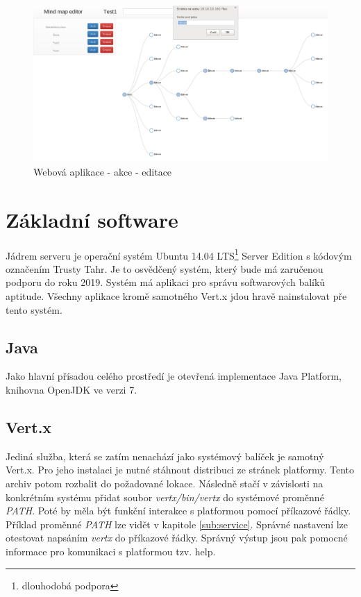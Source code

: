\begin{figure}
\begin{centering}
\includegraphics[width	=1\textwidth]{obrazky/mindmap3}
\par\end{centering}
\caption{Webová aplikace - akce - editace\label{fig:midnmap3}}
\end{figure}

\section{Základní software}

Jádrem serveru je operační systém Ubuntu\cite{ubuntu} 14.04 LTS\footnote{dlouhodobá podpora} Server Edition s kódovým označením 
Trusty Tahr. Je to osvědčený systém, který bude má zaručenou podporu do roku 2019. Systém má aplikaci pro správu softwarových balíků 
aptitude. Všechny aplikace kromě samotného Vert.x jdou hravě nainstalovat pře tento systém.

\subsection{Java}

Jako hlavní přísadou celého prostředí je otevřená implementace Java Platform, knihovna OpenJDK ve verzi 7.

\subsection{Vert.x}

Jediná služba, která se zatím nenachází jako systémový balíček je samotný Vert.x. Pro jeho instalaci je nutné stáhnout distribuci ze stránek platformy. Tento archiv potom rozbalit do požadované lokace. Následně stačí v závislosti na konkrétním systému přidat soubor \emph{vertx/bin/vertx} do systémové proměnné \emph{PATH}. Poté by měla být funkční interakce s platformou pomocí příkazové řádky. Příklad proměnné \emph{PATH} lze vidět v kapitole \ref{sub:service}. Správné nastavení lze otestovat napsáním \emph{vertx} do příkazové řádky. Správný výstup jsou pak pomocné informace pro komunikaci s platformou tzv. help.

